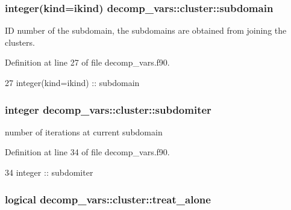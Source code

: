 \subsubsection[{subdomain}]{\setlength{\rightskip}{0pt plus 5cm}integer(kind=ikind) decomp\+\_\+vars\+::cluster\+::subdomain\hspace{0.3cm}{\ttfamily [private]}}\label{structdecomp__vars_1_1cluster_a6b081fbb823b1cc7bb949c5818e83494}


ID number of the subdomain, the subdomains are obtained from joining the clusters. 



Definition at line 27 of file decomp\+\_\+vars.\+f90.


\begin{DoxyCode}
27     \textcolor{keywordtype}{integer(kind=ikind)}   :: subdomain
\end{DoxyCode}
\subsubsection[{subdomiter}]{\setlength{\rightskip}{0pt plus 5cm}integer decomp\+\_\+vars\+::cluster\+::subdomiter\hspace{0.3cm}{\ttfamily [private]}}\label{structdecomp__vars_1_1cluster_a30683e939b5f8b9d66a240ab6edd8857}


number of iterations at current subdomain 



Definition at line 34 of file decomp\+\_\+vars.\+f90.


\begin{DoxyCode}
34     \textcolor{keywordtype}{integer} :: subdomiter
\end{DoxyCode}
\subsubsection[{treat\+\_\+alone}]{\setlength{\rightskip}{0pt plus 5cm}logical decomp\+\_\+vars\+::cluster\+::treat\+\_\+alone\hspace{0.3cm}{\ttfamily [private]}}\label{structdecomp__vars_1_1cluster_ab404ccbe86d9d1f31e26a84b2eeeff20}


